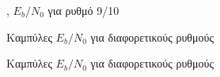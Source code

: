 \begin{figure}[H]
\caption{, $E_b/N_0$ για ρυθμό 9/10}
\end{figure}

\begin{figure}[H]
\caption{Καμπύλες  $E_b/N_0$ για διαφορετικούς ρυθμούς}
\end{figure}

\begin{figure}[H]
\caption{Καμπύλες  $E_b/N_0$ για διαφορετικούς ρυθμούς}
\end{figure}

